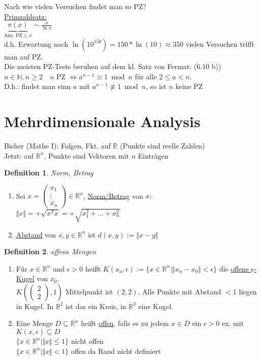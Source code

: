 \documentclass[a4paper,11pt]{article}
\newtheorem{definition}{Definition}[section]
\begin{document}
Nach wie vielen Versuchen findet man so PZ? \\
\underline{Primzahlsatz:} \\
$\underbrace{\pi(x)}_{\text{Anz. PZ}\leq x}\sim\frac{x}{\ln x}$ \\
d.h. Erwartung nach $\ln(10^{150})=150*\ln(10)\approx350$ vielen Versuchen trifft man auf PZ. \\
Die meisten PZ-Tests beruhen auf dem kl. Satz von Fermat: (6.10 b)) \\
$n\in\mathbb{N},n\geq2\quad n$ PZ $\Leftrightarrow a^{n-1}\equiv1\bmod n$ für alle $2\leq a<n$. \\ 
D.h.: findet man einn $a$ mit $a^{n-1}\not\equiv1\bmod n$, so ist $n$ keine PZ \\

\newpage

\section{Mehrdimensionale Analysis}
Bisher (Mathe I): Folgen, Fkt. auf $\mathbb{R}$ (Punkte sind reelle Zahlen) \\
Jetzt: auf $\mathbb{R}^n$, Punkte sind Vektoren mit $n$ Einträgen \\
\begin{definition}
	Norm, Betrag
\end{definition}
\begin{enumerate}[label=\alph*)]
	\item Sei $x=\begin{pmatrix}x_1\\\vdots\\x_n\end{pmatrix}\in\mathbb{R}^n$, \underline{Norm/Betrag} von $x$: \\
	$\Vert x\Vert=+\sqrt{x^Tx}=+\sqrt{x^2_1+\hdots+x^2_n}$
	\item \underline{Abstand} von $x,y\in\mathbb{R}^n$ ist $d(x,y):=\Vert x-y\Vert$
\end{enumerate}

\begin{definition}
	offene Mengen
\end{definition}
\begin{enumerate}[label=\alph*)]
	\item Für $x\in\mathbb{R}^n$ und $\epsilon>0$ heißt $K(x_o,\epsilon):=\{x\in\mathbb{R}^n\mid\Vert x_n-x_0\Vert<\epsilon\}$ die \underline{offene $\epsilon$-Kugel} von $x_0$. \\
	$K(\begin{pmatrix}2\\2\end{pmatrix},1)$ Mittelpunkt ist $(2,2)$. Alle Punkte mit Abstand $<1$ liegen in Kugel. In $\mathbb{R}^2$ ist das ein Kreis, in $\mathbb{R}^3$ eine Kugel.
	\item Eine Menge $D\subseteq\mathbb{R}^n$ heißt \underline{offen}, falls es zu jedem $x\in D$ ein $\epsilon>0$ ex. mit $K(x,\epsilon)\subseteq D$ \\
	$\{x\in\mathbb{R}^n\mid\Vert x\Vert\leq 1\}$ nicht offen \\
	$\{x\in\mathbb{R}^n\mid\Vert x\Vert< 1\}$ offen da Rand nicht definiert
\end{enumerate}
\end{document}
